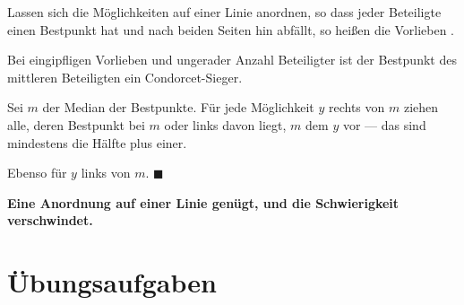 \begin{merksatz}
Lassen sich die Möglichkeiten auf einer Linie anordnen, so dass jeder Beteiligte einen Bestpunkt hat und nach beiden Seiten hin abfällt, so heißen die Vorlieben .

Bei eingipfligen Vorlieben und ungerader Anzahl Beteiligter ist der Bestpunkt des mittleren Beteiligten ein Condorcet-Sieger.

Sei $m$ der Median der Bestpunkte. Für jede Möglichkeit $y$ rechts von $m$ ziehen alle, deren Bestpunkt bei $m$ oder links davon liegt, $m$ dem $y$ vor --- das sind mindestens die Hälfte plus einer.

Ebenso für $y$ links von $m$. $\blacksquare$

\begin{center}
\begin{minipage}{0.9\textwidth}
\textbf{Eine Anordnung auf einer Linie genügt, und die Schwierigkeit verschwindet.}
\end{minipage}
\end{center}

\begin{center}
\begin{minipage}{0.88\textwidth}
\end{minipage}
\end{center}
\end{merksatz}

\section{Übungsaufgaben}

